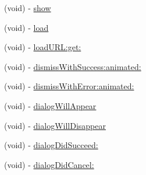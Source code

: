 \begin{DoxyCompactItemize}
\item 
(void) -\/ \hyperlink{interfaceFBDialog_a657a94d26c8dd3dfbe60b64c6bcbf411}{show}
\item 
(void) -\/ \hyperlink{interfaceFBDialog_a41ca6458674d1701e6e1d143d5aeb972}{load}
\item 
(void) -\/ \hyperlink{interfaceFBDialog_a48ed8ccf4d0c21239524cbfb0ef1c2bf}{load\+U\+R\+L\+:get\+:}
\item 
(void) -\/ \hyperlink{interfaceFBDialog_a5250f7dbf293b91efbc498cd980ea629}{dismiss\+With\+Success\+:animated\+:}
\item 
(void) -\/ \hyperlink{interfaceFBDialog_a88519295b89d9f78791bf316a34af3e1}{dismiss\+With\+Error\+:animated\+:}
\item 
(void) -\/ \hyperlink{interfaceFBDialog_ad0bfcbe959e7334d076079ce3288142d}{dialog\+Will\+Appear}
\item 
(void) -\/ \hyperlink{interfaceFBDialog_a0aaf0151353b93b543525601f9d41a83}{dialog\+Will\+Disappear}
\item 
(void) -\/ \hyperlink{interfaceFBDialog_a038587c0962d2dbda704f151d45eb6d3}{dialog\+Did\+Succeed\+:}
\item 
(void) -\/ \hyperlink{interfaceFBDialog_a91e729bd79578cb130cf5256e1fb2b8e}{dialog\+Did\+Cancel\+:}
\end{DoxyCompactItemize}
